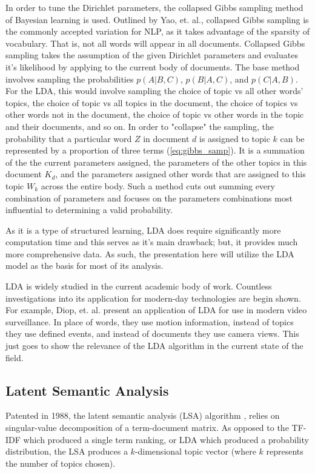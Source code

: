 \documentclass[conference]{IEEEtran}
\begin{document}
In order to tune the Dirichlet parameters, the collapsed Gibbs sampling method of Bayesian learning is used. Outlined by Yao, et. al.\cite{yao2009efficient}, collapsed Gibbs sampling is the commonly accepted variation for NLP, as it takes advantage of the sparsity of vocabulary. That is, not all words will appear in all documents. Collapsed Gibbs sampling takes the assumption of the given Dirichlet parameters and evaluates it's likelihood by applying to the current body of documents. The base method involves sampling the probabilities $p(A|B,C)$, $p(B|A,C)$, and $p(C|A,B)$. For the LDA, this would involve sampling the choice of topic vs all other words' topics, the choice of topic vs all topics in the document, the choice of topics vs other words not in the document, the choice of topic vs other words in the topic and their documents, and so on.  In order to "collapse" the sampling, the probability that a particular word $Z$ in document $d$ is assigned to topic $k$ can be represented by a proportion of three terms (\ref{eq:gibbs_samp}). It is a summation of the the current parameters assigned, the parameters of the other topics in this document $K_d$, and the parameters assigned other words that are assigned to this topic $W_k$ across the entire body. Such a method cuts out summing every combination of parameters and focuses on the parameters combinations most influential to determining a valid probability.

As it is a type of structured learning, LDA does require significantly more computation time and this serves as it's main drawback; but, it provides much more comprehensive data. As such, the presentation here will utilize the LDA model as the basis for most of its analysis.

LDA is widely studied in the current academic body of work. Countless investigations into its application for modern-day technologies are begin shown. For example, Diop, et. al. \cite{8323808} present an application of LDA for use in modern video surveillance. In place of words, they use motion information, instead of topics they use defined events, and instead of documents they use camera views. This just goes to show the relevance of the LDA algorithm in the current state of the field.

\subsection{Latent Semantic Analysis}

Patented in 1988, the latent semantic analysis (LSA) algorithm \cite{patent4839853}, relies on singular-value decomposition of a term-document matrix. As opposed to the TF-IDF which produced a single term ranking, or LDA which produced a probability distribution, the LSA produces a $k$-dimensional topic vector (where $k$ represents the number of topics chosen).
\end{document}

